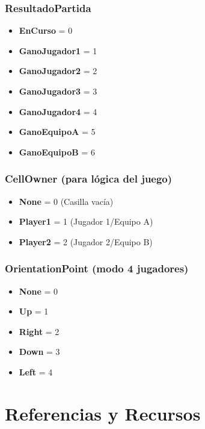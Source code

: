 \documentclass[12pt]{article}
\begin{document}
\subsubsection*{ResultadoPartida}
\begin{itemize}
    \item \textbf{EnCurso} = 0
    \item \textbf{GanoJugador1} = 1
    \item \textbf{GanoJugador2} = 2
    \item \textbf{GanoJugador3} = 3
    \item \textbf{GanoJugador4} = 4
    \item \textbf{GanoEquipoA} = 5
    \item \textbf{GanoEquipoB} = 6
\end{itemize}

\subsubsection*{CellOwner (para lógica del juego)}
\begin{itemize}
    \item \textbf{None} = 0 (Casilla vacía)
    \item \textbf{Player1} = 1 (Jugador 1/Equipo A)
    \item \textbf{Player2} = 2 (Jugador 2/Equipo B)
\end{itemize}

\subsubsection*{OrientationPoint (modo 4 jugadores)}
\begin{itemize}
    \item \textbf{None} = 0
    \item \textbf{Up} = 1
    \item \textbf{Right} = 2
    \item \textbf{Down} = 3
    \item \textbf{Left} = 4
\end{itemize}

\section*{Referencias y Recursos}
\end{document}
